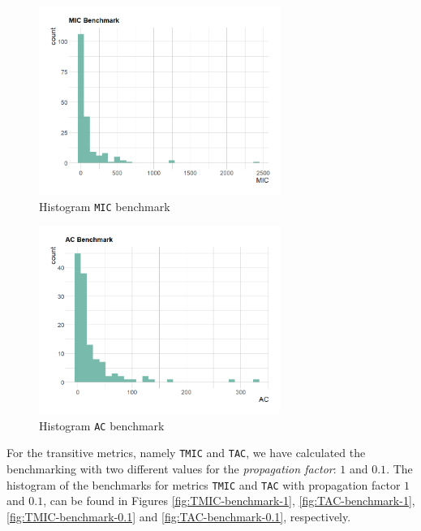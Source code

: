 \begin{figure}[ht!]
\begin{center}
  \includegraphics[width=0.7\textwidth]{figures/benchmark/MIC_benchmark.png}
  \caption{Histogram \texttt{MIC} benchmark}
  \label{fig:MIC-benchmark}
\end{center}
\end{figure}

\begin{figure}[ht!]
\begin{center}
\includegraphics[width=0.7\textwidth]{figures/benchmark/AC_benchmark.png}
\caption{Histogram \texttt{AC} benchmark}
\label{fig:AC-benchmark}
\end{center}
\end{figure}

For the transitive metrics, namely \texttt{TMIC} and \texttt{TAC}, we have calculated the benchmarking with two different values for the \textit{propagation factor}: $1$ and $0.1$. The histogram of the benchmarks for metrics \texttt{TMIC} and \texttt{TAC} with propagation factor $1$ and $0.1$, can be found in Figures \ref{fig:TMIC-benchmark-1}, \ref{fig:TAC-benchmark-1}, \ref{fig:TMIC-benchmark-0.1} and \ref{fig:TAC-benchmark-0.1}, respectively.

